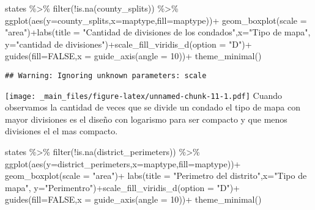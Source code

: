 \documentclass[
]{book}
\newenvironment{Shaded}{\begin{snugshade}}{\end{snugshade}}
\newcommand{\AttributeTok}[1]{\textcolor[rgb]{0.77,0.63,0.00}{#1}}
\newcommand{\ConstantTok}[1]{\textcolor[rgb]{0.00,0.00,0.00}{#1}}
\newcommand{\DecValTok}[1]{\textcolor[rgb]{0.00,0.00,0.81}{#1}}
\newcommand{\FunctionTok}[1]{\textcolor[rgb]{0.00,0.00,0.00}{#1}}
\newcommand{\NormalTok}[1]{#1}
\newcommand{\SpecialCharTok}[1]{\textcolor[rgb]{0.00,0.00,0.00}{#1}}
\newcommand{\StringTok}[1]{\textcolor[rgb]{0.31,0.60,0.02}{#1}}
\begin{document}
\begin{Shaded}
\begin{Highlighting}[]
\NormalTok{states }\SpecialCharTok{\%\textgreater{}\%}
  \FunctionTok{filter}\NormalTok{(}\SpecialCharTok{!}\FunctionTok{is.na}\NormalTok{(county\_splits)) }\SpecialCharTok{\%\textgreater{}\%} 
\FunctionTok{ggplot}\NormalTok{(}\FunctionTok{aes}\NormalTok{(}\AttributeTok{y=}\NormalTok{county\_splits,}\AttributeTok{x=}\NormalTok{maptype,}\AttributeTok{fill=}\NormalTok{maptype))}\SpecialCharTok{+}
  \FunctionTok{geom\_boxplot}\NormalTok{(}\AttributeTok{scale =} \StringTok{"area"}\NormalTok{)}\SpecialCharTok{+}\FunctionTok{labs}\NormalTok{(}\AttributeTok{title =} \StringTok{"Cantidad de divisiones de los condados"}\NormalTok{,}\AttributeTok{x=}\StringTok{"Tipo de mapa"}\NormalTok{, }\AttributeTok{y=}\StringTok{"cantidad de divisiones"}\NormalTok{)}\SpecialCharTok{+}\FunctionTok{scale\_fill\_viridis\_d}\NormalTok{(}\AttributeTok{option =} \StringTok{"D"}\NormalTok{)}\SpecialCharTok{+}
  \FunctionTok{guides}\NormalTok{(}\AttributeTok{fill=}\ConstantTok{FALSE}\NormalTok{,}\AttributeTok{x =}  \FunctionTok{guide\_axis}\NormalTok{(}\AttributeTok{angle =} \DecValTok{10}\NormalTok{))}\SpecialCharTok{+}
  \FunctionTok{theme\_minimal}\NormalTok{()}
\end{Highlighting}
\end{Shaded}

\begin{verbatim}
## Warning: Ignoring unknown parameters: scale
\end{verbatim}

\texttt{[image: \_main\_files/figure-latex/unnamed-chunk-11-1.pdf]}
Cuando observamos la cantidad de veces que se divide un condado el tipo de mapa con mayor divisiones es el diseño con logarismo para ser compacto y que menos divisiones el el mas compacto.

\begin{Shaded}
\begin{Highlighting}[]
\NormalTok{states }\SpecialCharTok{\%\textgreater{}\%}
  \FunctionTok{filter}\NormalTok{(}\SpecialCharTok{!}\FunctionTok{is.na}\NormalTok{(district\_perimeters)) }\SpecialCharTok{\%\textgreater{}\%} 
\FunctionTok{ggplot}\NormalTok{(}\FunctionTok{aes}\NormalTok{(}\AttributeTok{y=}\NormalTok{district\_perimeters,}\AttributeTok{x=}\NormalTok{maptype,}\AttributeTok{fill=}\NormalTok{maptype))}\SpecialCharTok{+}
  \FunctionTok{geom\_boxplot}\NormalTok{(}\AttributeTok{scale =} \StringTok{"area"}\NormalTok{)}\SpecialCharTok{+}
  \FunctionTok{labs}\NormalTok{(}\AttributeTok{title =} \StringTok{"Perimetro del distrito"}\NormalTok{,}\AttributeTok{x=}\StringTok{"Tipo de mapa"}\NormalTok{, }\AttributeTok{y=}\StringTok{"Perimentro"}\NormalTok{)}\SpecialCharTok{+}\FunctionTok{scale\_fill\_viridis\_d}\NormalTok{(}\AttributeTok{option =} \StringTok{"D"}\NormalTok{)}\SpecialCharTok{+}
  \FunctionTok{guides}\NormalTok{(}\AttributeTok{fill=}\ConstantTok{FALSE}\NormalTok{,}\AttributeTok{x =}  \FunctionTok{guide\_axis}\NormalTok{(}\AttributeTok{angle =} \DecValTok{10}\NormalTok{))}\SpecialCharTok{+}
  \FunctionTok{theme\_minimal}\NormalTok{()}
\end{Highlighting}
\end{Shaded}
\end{document}
